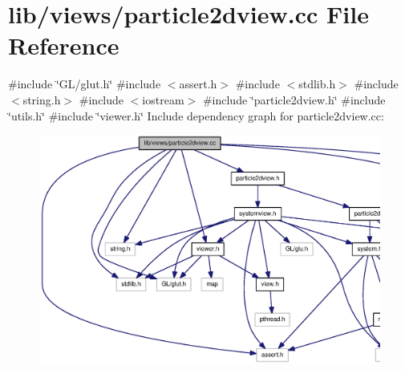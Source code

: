 \section{lib/views/particle2dview.cc \-File \-Reference}
\label{particle2dview_8cc}
{\ttfamily \#include \char`\"{}\-G\-L/glut.\-h\char`\"{}}\*
{\ttfamily \#include $<$assert.\-h$>$}\*
{\ttfamily \#include $<$stdlib.\-h$>$}\*
{\ttfamily \#include $<$string.\-h$>$}\*
{\ttfamily \#include $<$iostream$>$}\*
{\ttfamily \#include \char`\"{}particle2dview.\-h\char`\"{}}\*
{\ttfamily \#include \char`\"{}utils.\-h\char`\"{}}\*
{\ttfamily \#include \char`\"{}viewer.\-h\char`\"{}}\*
\-Include dependency graph for particle2dview.\-cc\-:\nopagebreak
\begin{figure}[H]
\begin{center}
\leavevmode
\includegraphics[width=350pt]{particle2dview_8cc__incl}
\end{center}
\end{figure}

